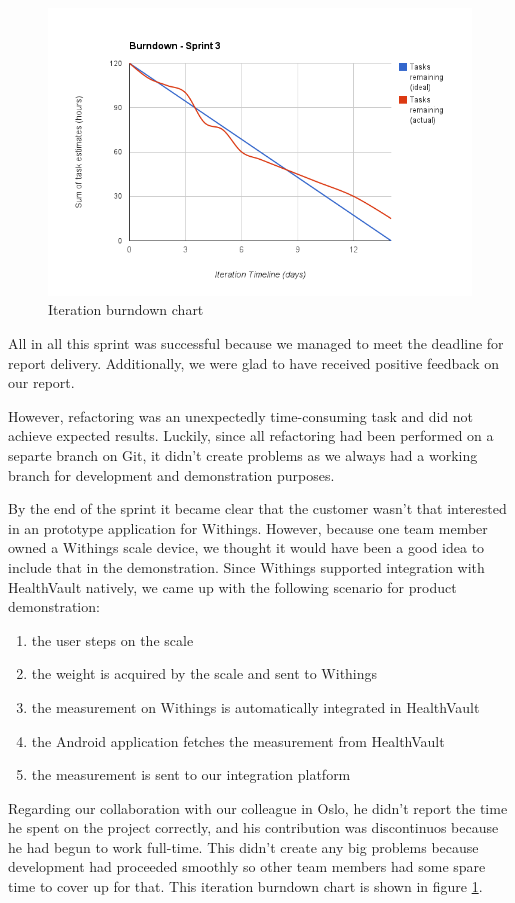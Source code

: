 \begin{figure}
\centering
\includegraphics[scale=0.60]{../Figures/burndownSprint3.png}
\caption{Iteration burndown chart}
\label{figure:burndownsprint3}
\end{figure}

All in all this sprint was successful because we managed to meet the deadline for report delivery.
Additionally, we were glad to have received positive feedback on our report.

However, refactoring was an unexpectedly time-consuming task and did not achieve expected results.
Luckily, since all refactoring had been performed on a separte branch on Git, it didn't create
problems as we always had a working branch for development and demonstration purposes.

By the end of the sprint it became clear that the customer wasn't that interested in an
prototype application for Withings. However, because one team member owned a Withings scale device,
we thought it would have been a good idea to include that in the demonstration.
Since Withings supported integration with HealthVault natively, we came up with the
following scenario for product demonstration:
\begin{enumerate}[1)]
\item the user steps on the scale
\item the weight is acquired by the scale and sent to Withings
\item the measurement on Withings is automatically integrated in HealthVault
\item the Android application fetches the measurement from HealthVault
\item the measurement is sent to our integration platform
\end{enumerate}
Regarding our collaboration with our colleague in Oslo, he didn't report the time he spent on the
project correctly, and his contribution was discontinuos because he had begun to work full-time.
This didn't create any big problems because development had proceeded smoothly so other
team members had some spare time to cover up for that.
This iteration burndown chart is shown in figure \ref{figure:burndownsprint3}.

